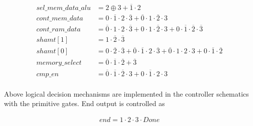 \documentclass[12pt]{article}
\begin{document}
\begin{align*}
sel\_ mem\_ data\_ alu &= 2 \oplus 3 + \overline{1} \cdot 2 \\
cont\_ mem\_ data &= 0 \cdot \overline{1} \cdot 2 \cdot \overline{3} + \overline{0} \cdot 1 \cdot \overline{2} \cdot 3 \\
cont\_ ram\_ data &= \overline{0} \cdot 1 \cdot 2 \cdot \overline{3} + 0 \cdot 1 \cdot \overline{2} \cdot 3 + 0 \cdot \overline{1} \cdot \overline{2} \cdot \overline{3} \\
shamt[1] &= 1 \cdot \overline{2} \cdot \overline{3} \\
shamt[0] &= 0 \cdot \overline{2} \cdot \overline{3} + \overline{0} \cdot \overline{1} \cdot 2 \cdot \overline{3} + \overline{0} \cdot 1 \cdot 2 \cdot 3 + 0 \cdot \overline{1} \cdot \overline{2} \\
memory\_select &= \overline{0} \cdot \overline{1} \cdot \overline{2} + \overline{3} \\
cmp\_en &= \overline{0} \cdot \overline{1} \cdot \overline{2} \cdot 3 + 0 \cdot \overline{1} \cdot 2 \cdot 3 \\
\end{align*}

Above logical decision mechanisms are implemented in the controller schematics with the primitive gates. End output is controlled as

\begin{align*}
end = 1 \cdot 2 \cdot 3 \cdot Done
\end{align*}
\end{document}

